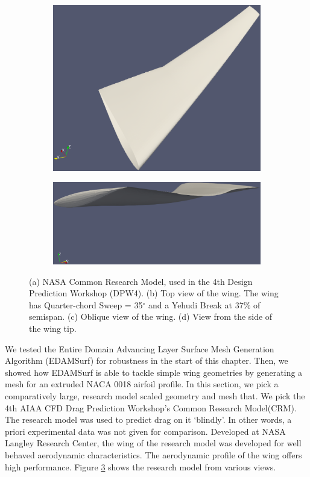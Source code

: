 \begin{figure}[!hbt]
\begin{subfigure}{0.45\textwidth}
		\centering
		\includegraphics[width=0.96\linewidth]{img/r/dpw4/wingOblique.eps}
		\caption{}
		\label{wingOblique}
	\end{subfigure}
	\begin{subfigure}{\textwidth}
		\centering
		\includegraphics[width=0.88\linewidth,trim={0 8cm 0 5cm},clip]{img/r/dpw4/wingTip.eps}
		\caption{}
		\label{wingTip}
	\end{subfigure}
	\caption[Various views of NASA Common Research Model(CRM) airplane.]{(a) NASA Common Research Model, used in the 4th Design Prediction Workshop (DPW4). (b) Top view of the wing. The wing has Quarter-chord Sweep = 35$^\circ$ and a Yehudi Break at 37$\%$ of semispan. (c) Oblique view of the wing. (d) View from the side of the wing tip.}
	\label{fig-dpw4}
\end{figure}

We tested the Entire Domain Advancing Layer Surface Mesh Generation Algorithm (EDAMSurf) for robustness in the start of this chapter. Then, we showed how EDAMSurf is able to tackle simple wing geometries by generating a mesh for an extruded NACA 0018 airfoil profile. In this section, we pick a comparatively large, research model scaled geometry and mesh that. We pick the 4th AIAA CFD Drag Prediction Workshop's Common Research Model(CRM)\cite{vassberg2008development}. The research model was used to predict drag on it `blindly'. In other words, a priori experimental data was not given for comparison. Developed at NASA Langley Research Center, the wing of the research model was developed for well behaved aerodynamic characteristics. The aerodynamic profile of the wing offers high performance. Figure \ref{fig-dpw4} shows the research model from various views.

